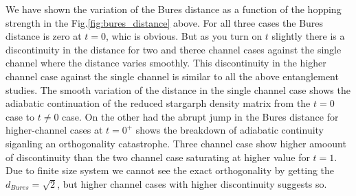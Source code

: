 \documentclass[reprint,prb,superscriptaddress]{revtex4-2}
\begin{document}
We have shown the variation of the Bures distance as a function of the hopping strength in the Fig.\ref{fig:bures_distance} above. For all three cases the Bures distance is zero at $t=0$, whic is obvious. But as you turn on $t$ slightly there is a discontinuity in the distance for two and theree channel cases against the single channel where the distance varies smoothly. This discontinuity in the higher channel case against the single channel is similar to all the above entanglement studies. The smooth variation of the distance in the single channel case shows the adiabatic continuation of the reduced stargarph density matrix from the $t=0$ case to $t\neq 0$ case. On the other had the abrupt jump in the Bures distance for higher-channel cases at $t=0^+$ shows the breakdown of adiabatic continuity siganling an orthogonality catastrophe. Three channel case show higher amoount of discontinuity than the two channel case saturating at higher value for $t=1$. Due to finite size system we cannot see the exact orthogonality by getting the $d_{Bures}=\sqrt{2}$, but higher channel cases with higher discontinuity suggests so.
\end{document}

